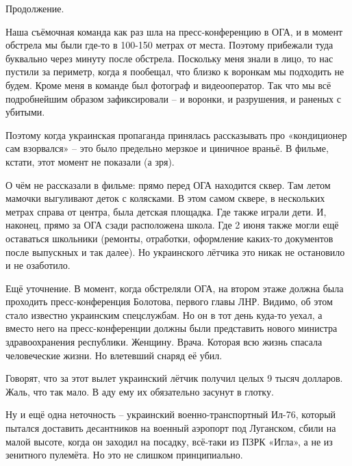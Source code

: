 \begin{itemize}
\begin{itemize}
\end{itemize}

 
Продолжение.

Наша съёмочная команда как раз шла на пресс-конференцию в ОГА, и в момент
обстрела мы были где-то в 100-150 метрах от места. Поэтому прибежали туда
буквально через минуту после обстрела. Поскольку меня знали в лицо, то нас
пустили за периметр, когда я пообещал, что близко к воронкам мы подходить не
будем. Кроме меня в команде был фотограф и видеооператор. Так что мы всё
подробнейшим образом зафиксировали – и воронки, и разрушения, и раненых с
убитыми.

Поэтому когда украинская пропаганда принялась рассказывать про «кондиционер сам
взорвался» – это было предельно мерзкое и циничное враньё. В фильме, кстати,
этот момент не показали (а зря).

О чём не рассказали в фильме: прямо перед ОГА находится сквер. Там летом
мамочки выгуливают деток с колясками. В этом самом сквере, в нескольких метрах
справа от центра, была детская площадка. Где также играли дети. И, наконец,
прямо за ОГА сзади расположена школа. Где 2 июня также могли ещё оставаться
школьники (ремонты, отработки, оформление каких-то документов после выпускных и
так далее). Но украинского лётчика это никак не остановило и не озаботило.

Ещё уточнение. В момент, когда обстреляли ОГА, на втором этаже должна была
проходить пресс-конференция Болотова, первого главы ЛНР. Видимо, об этом стало
известно украинским спецслужбам. Но он в тот день куда-то уехал, а вместо него
на пресс-конференции должны были представить нового министра здравоохранения
республики. Женщину. Врача. Которая всю жизнь спасала человеческие жизни. Но
влетевший снаряд её убил.

Говорят, что за этот вылет украинский лётчик получил целых 9 тысяч долларов.
Жаль, что так мало. В аду ему их обязательно засунут в глотку.

Ну и ещё одна неточность – украинский военно-транспортный Ил-76, который
пытался доставить десантников на военный аэропорт под Луганском, сбили на малой
высоте, когда он заходил на посадку, всё-таки из ПЗРК «Игла», а не из зенитного
пулемёта. Но это не слишком принципиально.


\end{itemize}

